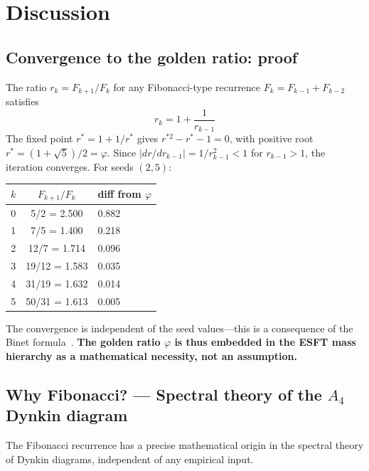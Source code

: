 ﻿\documentclass[twocolumn,preprintnumbers,amsmath,amssymb,prd]{revtex4-2}
\begin{document}
\section{Discussion}
\label{sec:discussion}

\subsection{Convergence to the golden ratio: proof}

The ratio $r_k = F_{k+1}/F_k$ for any Fibonacci-type recurrence $F_k = F_{k-1} + F_{k-2}$ satisfies
\begin{equation}
r_k = 1 + \frac{1}{r_{k-1}}
\end{equation}
The fixed point $r^* = 1 + 1/r^*$ gives $r^{*2} - r^* - 1 = 0$, with positive root $r^* = (1+\sqrt{5})/2 = \varphi$. Since $|dr/dr_{k-1}| = 1/r_{k-1}^2 < 1$ for $r_{k-1} > 1$, the iteration converges. For seeds $(2, 5)$:

\begin{center}
\begin{tabular}{ccl}
$k$ & $F_{k+1}/F_k$ & diff from $\varphi$ \\ \hline
0 & 5/2 = 2.500 & 0.882 \\
1 & 7/5 = 1.400 & 0.218 \\
2 & 12/7 = 1.714 & 0.096 \\
3 & 19/12 = 1.583 & 0.035 \\
4 & 31/19 = 1.632 & 0.014 \\
5 & 50/31 = 1.613 & 0.005 \\
\end{tabular}
\end{center}

The convergence is independent of the seed values---this is a consequence of the Binet formula~\cite{Binet}. \textbf{The golden ratio $\varphi$ is thus embedded in the ESFT mass hierarchy as a mathematical necessity, not an assumption.}

\subsection{Why Fibonacci? --- Spectral theory of the $A_4$ Dynkin diagram}
\label{sec:why_fibonacci}

The Fibonacci recurrence has a precise mathematical origin in the spectral theory of Dynkin diagrams, independent of any empirical input.
\end{document}
